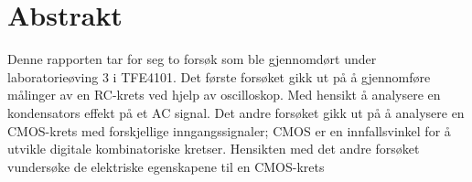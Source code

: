\section{Abstrakt}

    Denne rapporten tar for seg to forsøk  som ble gjennomdørt under laboratorieøving 3 i TFE4101. Det første forsøket gikk ut på å gjennomføre målinger av en RC-krets ved hjelp av oscilloskop.
    Med hensikt å analysere en kondensators effekt på et AC signal.
    Det andre forsøket gikk ut på å analysere en CMOS-krets med forskjellige inngangssignaler;
    CMOS er en innfallsvinkel for å utvikle digitale kombinatoriske kretser. Hensikten med det andre forsøket vundersøke de elektriske egenskapene til en CMOS-krets